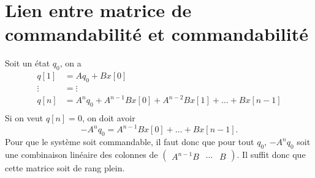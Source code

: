 \section{Lien entre matrice de commandabilité et commandabilité}
\label{ann:command}
Soit un état $q_0$, on a
\begin{align*}
  q[1] & = A q_0 + B x[0]\\
  \vdots & = \vdots\\
  q[n] & = A^nq_0 + A^{n-1}Bx[0] + A^{n-2}Bx[1] + \ldots + Bx[n-1]\\
\end{align*}
Si on veut $q[n] = 0$, on doit avoir
\[ -A^nq_0 = A^{n-1}Bx[0] + \ldots + Bx[n-1]. \]
Pour que le système soit commandable,
il faut donc que pour tout $q_0$, $-A^nq_0$ soit une combinaison
linéaire des colonnes de $\begin{pmatrix}A^{n-1}B & \cdots & B\end{pmatrix}$.
Il suffit donc %
que cette matrice soit de rang plein.



